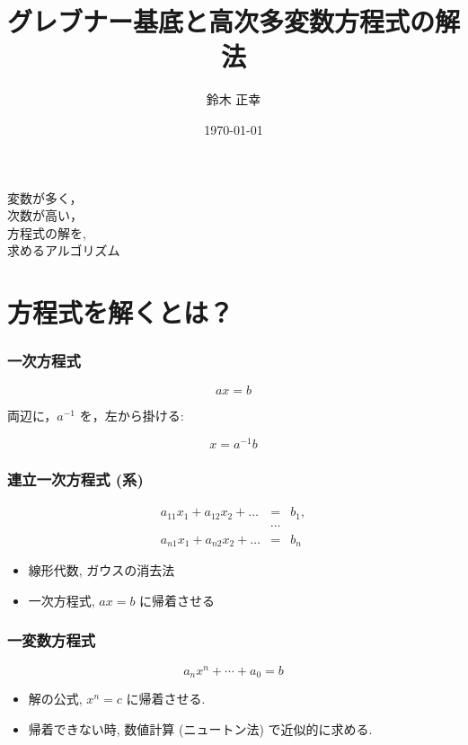 \title[略タイトル]{グレブナー基底と高次多変数方程式の解法}%
\author[まさゆき]{鈴木 正幸}%
\date{\today}%


\begin{frame}[plain]\frametitle{}
\titlepage %


\begin{center}
{\large 
変数が多く，\\
次数が高い，\\
方程式の解を, \\
求めるアルゴリズム}
\end{center}
\end{frame}



\section{方程式を解くとは？} 
\begin{frame}\frametitle{一次方程式}

 \[a x = b \] 
  
\begin{center}
両辺に，$a^{-1}$ を，左から掛ける:
\end{center}

 \[ x = a^{-1} b \]

\end{frame}

\begin{frame}\frametitle{連立一次方程式 (系)}
\[
    \begin{array}{rcl}
      a_{11} x_1 + a_{12} x_2 + \ldots & = & b_1,\\
      &  \cdots &  \\
      a_{n1} x_1 + a_{n2} x_2 + \ldots & = & b_n
    \end{array}
    \]
\begin{itemize}
	\item 線形代数, ガウスの消去法
	\item 一次方程式, $a x = b $ に帰着させる
\end{itemize}
\end{frame}

\begin{frame}\frametitle{一変数方程式}
  \[
  a_n x^n + \cdots + a_0 = b
  \]
  
  \begin{itemize}
  \item 解の公式, $x^n = c $ に帰着させる.
  \item 帰着できない時, 数値計算 (ニュートン法) で近似的に求める.
  \end{itemize}
\end{frame}

